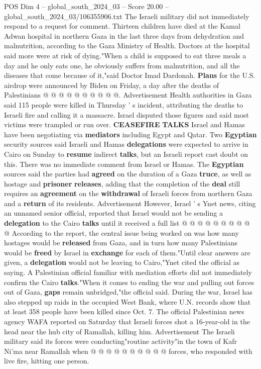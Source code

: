 \begin{textsample}{POS Dim 4 – global\_south\_2024\_03 – Score 20.00 – global\_south\_2024\_03/106355906.txt}
The Israeli military did not immediately respond to a request for comment.
Thirteen children have died at the Kamal Adwan hospital in northern Gaza in the last three days from dehydration and malnutrition, according to the Gaza Ministry of Health.
Doctors at the hospital said more were at risk of dying."When a child is supposed to eat three meals a day and he only eats one, he obviously suffers from malnutrition, and all the diseases that come because of it,"said Doctor Imad Dardonah. \textbf{Plans} for the U.S. airdrop were announced by Biden on Friday, a day after the deaths of Palestinians @ @ @ @ @ @ @ @ @ @.
Advertisement Health authorities in Gaza said 115 people were killed in Thursday ' s incident, attributing the deaths to Israeli fire and calling it a massacre.
Israel disputed those figures and said most victims were trampled or run over. \textbf{CEASEFIRE} \textbf{TALKS} Israel and Hamas have been negotiating via \textbf{mediators} including Egypt and Qatar.
Two \textbf{Egyptian} security sources said Israeli and Hamas \textbf{delegations} were expected to arrive in Cairo on Sunday to \textbf{resume} indirect \textbf{talks}, but an Israeli report cast doubt on this.
There was no immediate comment from Israel or Hamas.
The \textbf{Egyptian} sources said the parties had \textbf{agreed} on the duration of a Gaza \textbf{truce}, as well as hostage and \textbf{prisoner} \textbf{releases}, adding that the completion of the \textbf{deal} still requires an \textbf{agreement} on the \textbf{withdrawal} of Israeli forces from northern Gaza and a \textbf{return} of its residents.
Advertisement However, Israel ' s Ynet news, citing an unnamed senior official, reported that Israel would not be sending a \textbf{delegation} to the Cairo \textbf{talks} until it received a full list @ @ @ @ @ @ @ @ @ @ According to the report, the central issue being worked on was how many hostages would be \textbf{released} from Gaza, and in turn how many Palestinians would be \textbf{freed} by Israel in \textbf{exchange} for each of them."Until clear answers are given, a \textbf{delegation} would not be leaving to Cairo,"Ynet cited the official as saying.
A Palestinian official familiar with mediation efforts did not immediately confirm the Cairo \textbf{talks}."When it comes to ending the war and pulling out forces out of Gaza, \textbf{gaps} remain unbridged,"the official said.
During the war, Israel has also stepped up raids in the occupied West Bank, where U.N. records show that at least 358 people have been killed since Oct. 7.
The official Palestinian news agency WAFA reported on Saturday that Israeli forces shot a 16-year-old in the head near the hub city of Ramallah, killing him.
Advertisement The Israeli military said its forces were conducting"routine activity"in the town of Kafr Ni'ma near Ramallah when @ @ @ @ @ @ @ @ @ @ forces, who responded with live fire, hitting one person.

\end{textsample}
